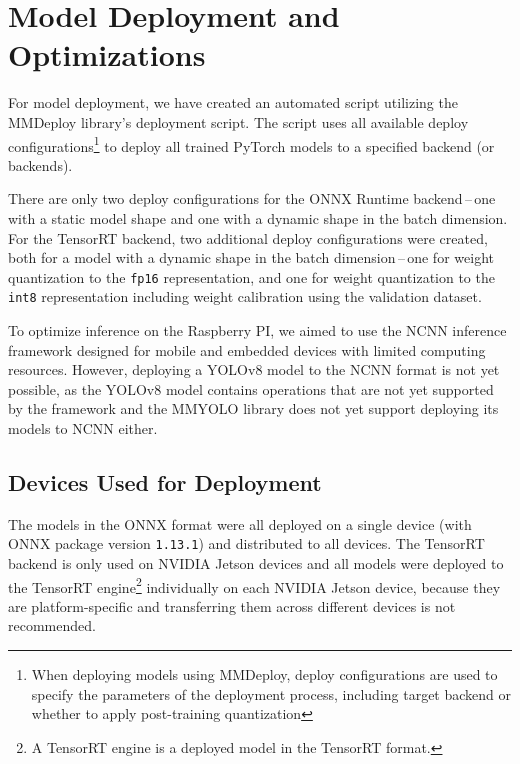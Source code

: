 \section{Model Deployment and Optimizations}

For model deployment, we have created an automated script utilizing the MMDeploy
library's deployment script. The script uses all available deploy
configurations\footnote{When deploying models using MMDeploy, deploy
configurations are used to specify the parameters of the deployment process,
including target backend or whether to apply post-training quantization} to
deploy all trained PyTorch models to a specified backend (or backends).

There are only two deploy configurations for the ONNX Runtime backend\,--\,one
with a static model shape and one with a
dynamic shape in the batch dimension. For the TensorRT backend,
two additional deploy configurations were created, both for a model with a
dynamic shape in the batch dimension\,--\,one for weight quantization to the
\texttt{fp16} representation, and one for weight quantization to the
\texttt{int8} representation including weight calibration using the validation
dataset.

To optimize inference on the Raspberry PI, we aimed to use the NCNN inference
framework designed for mobile and embedded devices with limited computing
resources. However, deploying a YOLOv8 model to the NCNN format is not yet
possible, as the YOLOv8 model contains operations that are not yet supported by
the framework and the MMYOLO library does not yet support deploying its models
to NCNN either.


\subsection*{Devices Used for Deployment}

The models in the ONNX format were all deployed on a single device (with ONNX
package version \texttt{1.13.1}) and distributed to all devices. The TensorRT
backend is only used on NVIDIA Jetson devices and all models were deployed to
the TensorRT engine\footnote{A TensorRT engine is a deployed model in the
TensorRT format.} individually on each NVIDIA Jetson device, because they are
platform-specific and transferring them across different devices is not
recommended.

